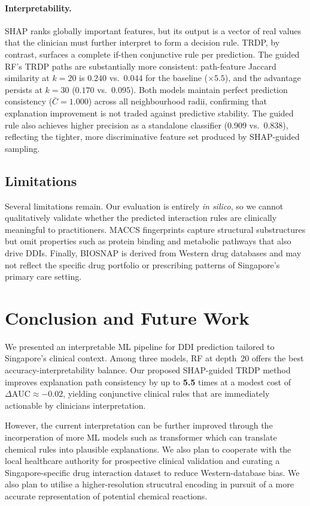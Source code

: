 \documentclass[letterpaper]{article} %
\begin{document}
\paragraph{Interpretability.}
SHAP ranks globally important features, but its output is a vector of real values that the clinician must further interpret to form a decision rule. TRDP, by contrast, surfaces a complete if-then conjunctive rule per prediction. The guided RF's TRDP paths are substantially more consistent: path-feature Jaccard similarity at $k=20$ is $0.240$ vs.\ $0.044$ for the baseline (${\times}5.5$), and the advantage persists at $k=30$ ($0.170$ vs.\ $0.095$). Both models maintain perfect prediction consistency ($\bar{C}=1.000$) across all neighbourhood radii, confirming that explanation improvement is not traded against predictive stability. The guided rule also achieves higher precision as a standalone classifier (0.909 vs.\ 0.838), reflecting the tighter, more discriminative feature set produced by SHAP-guided sampling.

\subsection{Limitations}
Several limitations remain. Our evaluation is entirely \textit{in silico}, so we cannot qualitatively validate whether the predicted interaction rules are clinically meaningful to practitioners. MACCS fingerprints capture structural substructures but omit properties such as protein binding and metabolic pathways that also drive DDIs. Finally, BIOSNAP is derived from Western drug databases and may not reflect the specific drug portfolio or prescribing patterns of Singapore's primary care setting.

\section{Conclusion and Future Work}
We presented an interpretable ML pipeline for DDI prediction tailored to Singapore's clinical context. Among three models, RF at depth~20 offers the best accuracy-interpretability balance. Our proposed SHAP-guided TRDP method improves explanation path consistency by up to \textbf{5.5} times at a modest cost of $\Delta\text{AUC}\approx{-0.02}$, yielding conjunctive clinical rules that are immediately actionable by clinicians interpretation. 

However, the current interpretation can be further improved through the incorperation of more ML models such as transformer which can translate chemical rules into plausible explanations. We also plan to cooperate with the local healthcare authority for prospective clinical validation and curating a Singapore-specific drug interaction dataset to reduce Western-database bias. We also plan to utilise a higher-resolution strucutral encoding in pursuit of a more accurate representation of potential chemical reactions.
\end{document}

